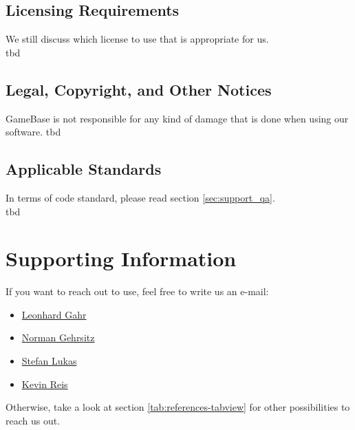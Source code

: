 \documentclass[a4paper,12pt,chapterprefix=false,bibliography=totoc,listof=totoc,]{scrreprt}
\begin{document}
\section{Licensing Requirements}
We still discuss which license to use that is appropriate for us.\\
\gls{tbd}

\section{Legal, Copyright, and Other Notices}
GameBase is not responsible for any kind of damage that is done when using our software. 
\gls{tbd}

\section{Applicable Standards}
In terms of code standard, please read section \ref{sec:support_qa}. \\

\gls{tbd}

\chapter{Supporting Information}
If you want to reach out to use, feel free to write us an e-mail:
\begin{itemize}
	\item \href{mailto:gahr.leonhard@student.dhbw-karlsruhe.de}{Leonhard Gahr}
	\item \href{mailto:gehrsitz.norman@student.dhbw-karlsruhe.de}{Norman Gehrsitz}
	\item \href{mailto:lukas.stefan@student.dhbw-karlsruhe.de}{Stefan Lukas}
	\item \href{mailto:reis.kevin@student.dhbw-karlsruhe.de}{Kevin Reis}
\end{itemize}

Otherwise, take a look at section \ref{tab:references-tabview} for other possibilities to reach us out.
\end{document}
